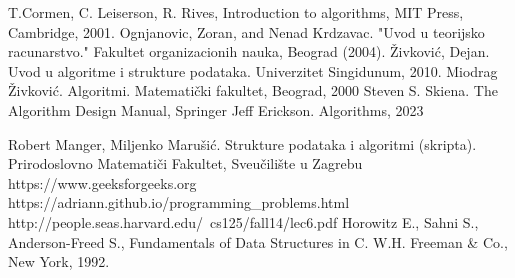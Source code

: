 \documentclass[b4paper,12pt]{book} %
\begin{document}


 


\backmatter
\begin{thebibliography}{9}
	T.Cormen, C. Leiserson, R. Rives, Introduction to algorithms, MIT Press, Cambridge, 2001.
	Ognjanovic, Zoran, and Nenad Krdzavac. "Uvod u teorijsko racunarstvo." Fakultet organizacionih nauka, Beograd (2004).
	Živković, Dejan. Uvod u algoritme i strukture podataka. Univerzitet Singidunum, 2010.
    Miodrag Živković. Algoritmi. Matematički fakultet, Beograd, 2000
    Steven S. Skiena. The Algorithm Design Manual, Springer
     Jeff Erickson. Algorithms, 2023
    
     Robert Manger, Miljenko Marušić. Strukture podataka i algoritmi (skripta).
    Prirodoslovno Matematiči Fakultet, Sveučilište u Zagrebu
    https://www.geeksforgeeks.org
      {https://adriann.github.io/programming\_problems.html}
    http://people.seas.harvard.edu/~cs125/fall14/lec6.pdf
     Horowitz E., Sahni S., Anderson-Freed S., Fundamentals of Data Structures in C. W.H. Freeman \& Co., New York, 1992.
\end{thebibliography}
\end{document}
